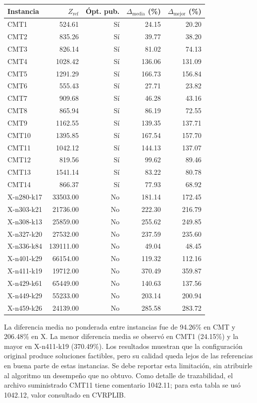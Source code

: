 \begin{center}\small
\begin{tabular}{lrrrr}\toprule
Instancia & $Z_{\mathrm{ref}}$ & Ópt. pub. & $\Delta_{\mathrm{media}}$ (\%) & $\Delta_{\mathrm{mejor}}$ (\%) \\\midrule
CMT1 & 524.61 & Sí & 24.15 & 20.20 \\
CMT2 & 835.26 & Sí & 39.77 & 38.20 \\
CMT3 & 826.14 & Sí & 81.02 & 74.13 \\
CMT4 & 1028.42 & Sí & 136.06 & 131.09 \\
CMT5 & 1291.29 & Sí & 166.73 & 156.84 \\
CMT6 & 555.43 & Sí & 27.71 & 23.82 \\
CMT7 & 909.68 & Sí & 46.28 & 43.16 \\
CMT8 & 865.94 & Sí & 86.19 & 72.55 \\
CMT9 & 1162.55 & Sí & 139.35 & 137.71 \\
CMT10 & 1395.85 & Sí & 167.54 & 157.70 \\
CMT11 & 1042.12 & Sí & 144.13 & 137.07 \\
CMT12 & 819.56 & Sí & 99.62 & 89.46 \\
CMT13 & 1541.14 & Sí & 83.22 & 80.78 \\
CMT14 & 866.37 & Sí & 77.93 & 68.92 \\
X-n280-k17 & 33503.00 & No & 181.14 & 172.45 \\
X-n303-k21 & 21736.00 & No & 222.30 & 216.79 \\
X-n308-k13 & 25859.00 & No & 255.62 & 249.85 \\
X-n327-k20 & 27532.00 & No & 237.59 & 235.60 \\
X-n336-k84 & 139111.00 & No & 49.04 & 48.45 \\
X-n401-k29 & 66154.00 & No & 119.32 & 112.16 \\
X-n411-k19 & 19712.00 & No & 370.49 & 359.87 \\
X-n429-k61 & 65449.00 & No & 140.63 & 137.56 \\
X-n449-k29 & 55233.00 & No & 203.14 & 200.94 \\
X-n459-k26 & 24139.00 & No & 285.58 & 283.72 \\
\bottomrule\end{tabular}
\end{center}
La diferencia media no ponderada entre instancias fue de 94.26\% en CMT y
206.48\% en X. La menor diferencia media se observó en CMT1
(24.15\%) y la mayor en X-n411-k19 (370.49\%). Los resultados muestran
que la configuración original produce soluciones factibles, pero su calidad
queda lejos de las referencias en buena parte de estas instancias. Se debe
reportar esta limitación, sin atribuirle al algoritmo un desempeño que no obtuvo.
Como detalle de trazabilidad, el archivo suministrado CMT11 tiene comentario
1042.11; para esta tabla se usó 1042.12, valor consultado en CVRPLIB.

